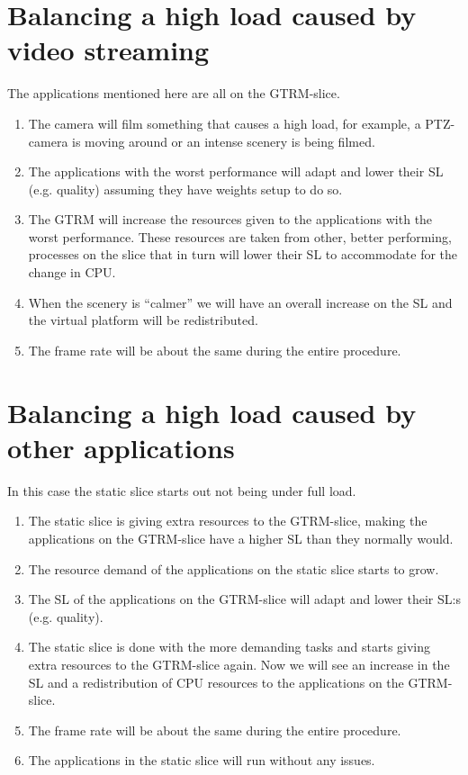 \documentclass{LTHthesis}
\begin{document}
\section{Balancing a high load caused by video streaming}
The applications mentioned here are all on the GTRM-slice.

\begin{enumerate}
\item The camera will film something that causes a high load, for example, a PTZ-camera is moving around or an intense scenery is being filmed.
\item The applications with the worst performance  will adapt and lower their SL (e.g. quality) assuming they have weights setup to do so.
\item The GTRM will increase the resources given to the applications with the worst performance. These resources are taken from other, better performing,  processes on the slice that in turn will lower their SL to accommodate for the change in CPU.
\item When the scenery is “calmer” we will have an overall increase on the SL and the virtual platform will be redistributed.
\item The frame rate will be about the same during the entire procedure.
\end{enumerate}
\section{Balancing a high load caused by other applications}
In this case the static slice starts out not being under full load.
\begin{enumerate}
\item The static slice is giving extra resources to the GTRM-slice, making the applications on the GTRM-slice have a higher SL than they normally would.
\item The resource demand of the applications on the static slice starts to grow. 
\item The SL of the applications on the GTRM-slice will adapt and lower their SL:s (e.g. quality).
\item The static slice is done with the more demanding tasks and starts giving extra resources to the GTRM-slice again. Now we will see an increase in the SL and a redistribution of CPU resources to the applications on the GTRM-slice.
\item The frame rate will be about the same during the entire procedure.
\item The applications in the static slice will run without any issues.
\end{enumerate}
\end{document}
